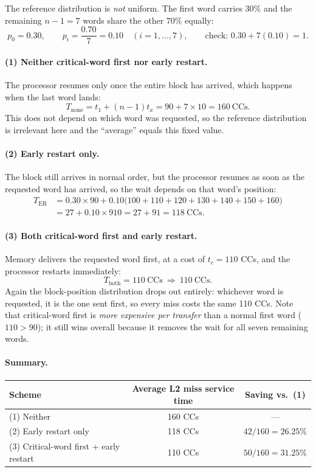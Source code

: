The reference distribution is \emph{not} uniform. The first word carries $30\%$ and the
remaining $n-1=7$ words share the other $70\%$ equally:
\[
  p_0=0.30,\qquad
  p_i=\frac{0.70}{7}=0.10\quad(i=1,\dots,7),
  \qquad\text{check: } 0.30+7(0.10)=1 .
\]

\paragraph{(1) Neither critical-word first nor early restart.}
The processor resumes only once the entire block has arrived, which happens when the
last word lands:
\[
  T_{\text{none}}=t_1+(n-1)t_x=90+7\times 10=\boxed{160\ \text{CCs}} .
\]
This does not depend on which word was requested, so the reference distribution is
irrelevant here and the ``average'' equals this fixed value.

\paragraph{(2) Early restart only.}
The block still arrives in normal order, but the processor resumes as soon as the
requested word has arrived, so the wait depends on that word's position:
\begin{align*}
  T_{\text{ER}}
  &= 0.30\times 90
   + 0.10\bigl(100+110+120+130+140+150+160\bigr)\\
  &= 27 + 0.10\times 910
   = 27+91
   = \boxed{118\ \text{CCs}} .
\end{align*}

\paragraph{(3) Both critical-word first and early restart.}
Memory delivers the requested word first, at a cost of $t_c=110$ CCs, and the processor
restarts immediately:
\[
  T_{\text{both}}=110\ \text{CCs}\ \Rightarrow\ \boxed{110\ \text{CCs}} .
\]
Again the block-position distribution drops out entirely: whichever word is requested,
it is the one sent first, so every miss costs the same 110 CCs. Note that
critical-word first is \emph{more expensive per transfer} than a normal first word
($110>90$); it still wins overall because it removes the wait for all seven remaining
words.

\paragraph{Summary.}
\begin{center}
\begin{tabular}{lcc}
\toprule
Scheme & Average L2 miss service time & Saving vs.\ (1)\\
\midrule
(1) Neither                       & 160 CCs & ---\\
(2) Early restart only            & 118 CCs & $42/160=26.25\%$\\
(3) Critical-word first + early restart & 110 CCs & $50/160=31.25\%$\\
\bottomrule
\end{tabular}
\end{center}

